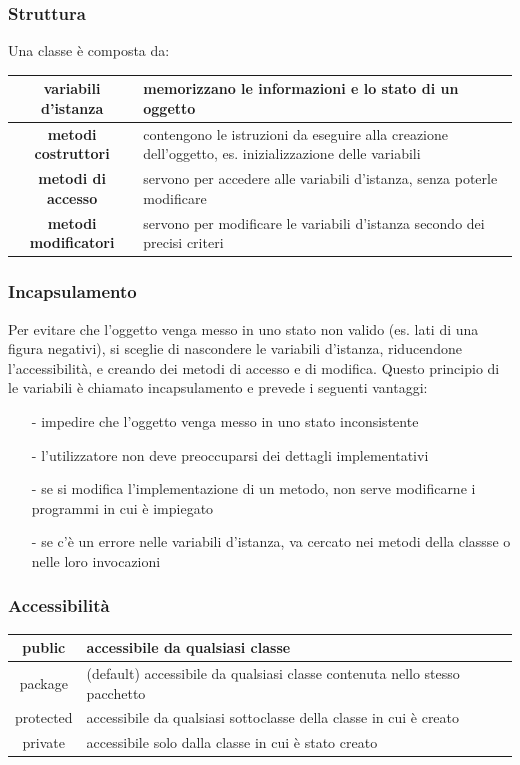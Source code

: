 \documentclass[a4paper]{article}
\begin{document}
\subsubsection*{Struttura}
Una classe è composta da:
\begin{center}
	\begin{tabularx}{\textwidth}{c X}
		\textbf{variabili d'istanza} & memorizzano le informazioni e lo stato di un oggetto \\
		\midrule
		\textbf{metodi costruttori} & contengono le istruzioni da eseguire alla creazione dell'oggetto, es. inizializzazione delle variabili \\
		\midrule
		\textbf{metodi di accesso} & servono per accedere alle variabili d'istanza, senza poterle modificare \\
		\midrule
		\textbf{metodi modificatori} & servono per modificare le variabili d'istanza secondo dei precisi criteri
	\end{tabularx}
\end{center}

\subsubsection*{Incapsulamento}
Per evitare che l'oggetto venga messo in uno stato non valido (es. lati di una figura negativi), si sceglie di nascondere le variabili
d'istanza, riducendone l'accessibilità, e creando dei metodi di accesso e di modifica. Questo principio di  le variabili è chiamato incapsulamento e prevede i seguenti vantaggi:
\begin{itemize}[topsep=3pt, itemsep=0pt]
	\item[-] impedire che l'oggetto venga messo in uno stato inconsistente
	\item[-] l'utilizzatore non deve preoccuparsi dei dettagli implementativi
	\item[-] se si modifica l'implementazione di un metodo, non serve modificarne i programmi in cui è impiegato
	\item[-] se c'è un errore nelle variabili d'istanza, va cercato nei metodi della classse o nelle loro invocazioni
\end{itemize}

\subsubsection*{Accessibilità}
\begin{center}
	\begin{tabularx}{\textwidth}{c X}
		public & accessibile da qualsiasi classe \\
		\midrule
		package & (default) accessibile da qualsiasi classe contenuta nello stesso pacchetto \\
		\midrule
		protected & accessibile da qualsiasi sottoclasse della classe in cui è creato \\
		\midrule
		private & accessibile solo dalla classe in cui è stato creato
	\end{tabularx}
\end{center}
\end{document}
